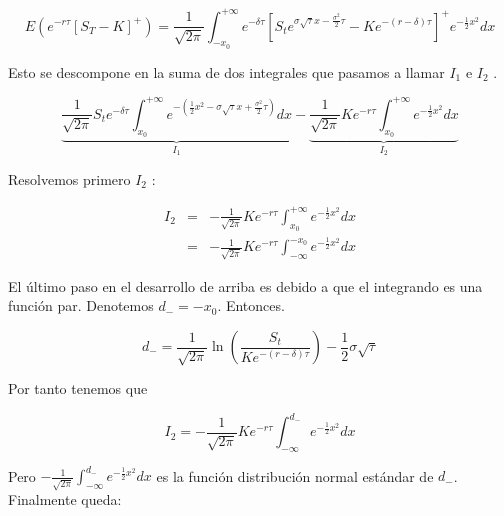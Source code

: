 \documentclass[12pt]{article}
\begin{document}
\begin{equation}
	E\left( e^{-r\tau} \left[ S_{T} - K \right] ^{+} \right) = \frac{1}{\sqrt{2\pi}}\int_{-x_{0}}^{+\infty}e^{-\delta\tau}
	\left[S_{t}e^{\sigma\sqrt{\tau}x-\frac{\sigma^{2}}{2}\tau}-Ke^{-(r-\delta)\tau}\right]^{+}e^{-
	\frac{1}{2}x^{2}}dx
\end{equation}
\newline

Esto se descompone en la suma de dos integrales que pasamos a llamar $I_{1}$ e $I_{2}$ .
\newline

\begin{equation}
	\underbrace{\frac{1}{\sqrt{2\pi}}S_{t}e^{-\delta\tau}\int_{x_{0}}^{+\infty}e^{-\left(\frac{1}{2}x^{2}-\sigma\sqrt{\tau}x
	 + \frac{\sigma^{2}}{2}\tau\right)}dx}_{I_{1}} - \underbrace{\frac{1}{\sqrt{2\pi}}Ke^{-r\tau}\int_{x_0}^{+\infty}
	e^{-\frac{1}{2}x^{2}}dx}_{I_{2}}
\end{equation}
\newline

Resolvemos primero $I_{2}$ :

\begin{eqnarray}
	I_{2} 	& = & -\frac{1}{\sqrt{2\pi}}Ke^{-r\tau}\int_{x_{0}}^{+\infty}e^{-\frac{1}{2}x^{2}}dx \nonumber \\
	      	& = & -\frac{1}{\sqrt{2\pi}}Ke^{-r\tau}\int_{-\infty}^{-x_{0}}e^{-\frac{1}{2}x^{2}}dx
\end{eqnarray}

El \'{u}ltimo paso en el desarrollo de arriba es debido a que el integrando es una funci\'{o}n par. Denotemos $d_{-} = -x_{0}$. Entonces.
\newline

\begin{equation}
	d_{-} = \frac{1}{\sqrt{2\pi}}\ln\left(\frac{S_{t}}{Ke^{-\left(r-\delta\right)\tau}}\right) - 
	\frac{1}{2}\sigma\sqrt{\tau}	
\end{equation}
\newline

Por tanto tenemos que
\newline

\begin{equation}
	I_{2} = -\frac{1}{\sqrt{2\pi}}Ke^{-r\tau}\int_{-\infty}^{d_{-}}e^{-\frac{1}{2}x^{2}}dx
\end{equation}
\newline

Pero $-\frac{1}{\sqrt{2\pi}}\int_{-\infty}^{d_{-}}e^{-\frac{1}{2}x^{2}}dx$ es la funci\'{o}n distribuci\'{o}n normal est\'{a}ndar
de $d_{-}$. Finalmente queda:
\newline
\end{document}
